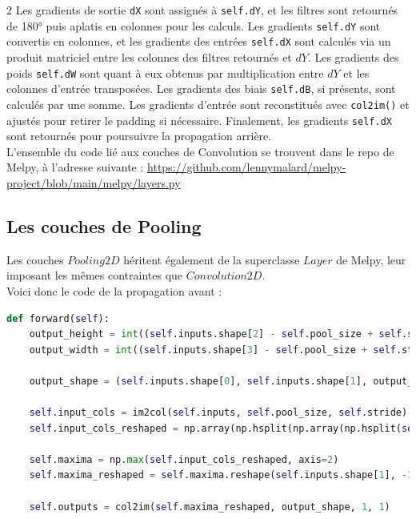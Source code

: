 \begin{multicols}{2}
Les gradients de sortie \texttt{dX} sont assignés à \texttt{self.dY}, et les filtres sont 
retournés de \ang{180} puis aplatis en colonnes pour les calculs. Les gradients \texttt{self.dY} 
sont convertis en colonnes, et les gradients des entrées \texttt{self.dX} sont calculés 
via un produit matriciel entre les colonnes des filtres retournés et $dY$. 
Les gradients des poids \texttt{self.dW} sont quant à eux obtenus par multiplication entre $dY$ et 
les colonnes d’entrée transposées. Les gradients des biais \texttt{self.dB}, si présents, sont calculés par une somme. 
Les gradients d’entrée sont reconstitués avec \texttt{col2im()} et ajustés pour retirer le padding si nécessaire. 
Finalement, les gradients \texttt{self.dX} sont retournés pour poursuivre la propagation arrière. \\

L'ensemble du code lié aux couches de Convolution se trouvent dans le repo de Melpy, à l'adresse suivante : \url{https://github.com/lennymalard/melpy-project/blob/main/melpy/layers.py}

\subsection{Les couches de Pooling}

Les couches $Pooling2D$ héritent également de la superclasse $Layer$ 
de Melpy, leur imposant les mêmes contraintes que $Convolution2D$.\\

Voici donc le code de la propagation avant : \\

\begin{lstlisting}[language=Python]
def forward(self):
    output_height = int((self.inputs.shape[2] - self.pool_size + self.stride) // self.stride)
    output_width = int((self.inputs.shape[3] - self.pool_size + self.stride) // self.stride)

    output_shape = (self.inputs.shape[0], self.inputs.shape[1], output_height, output_width)

    self.input_cols = im2col(self.inputs, self.pool_size, self.stride)
    self.input_cols_reshaped = np.array(np.hsplit(np.array(np.hsplit(self.input_cols, self.inputs.shape[0])), self.inputs.shape[1]))

    self.maxima = np.max(self.input_cols_reshaped, axis=2)
    self.maxima_reshaped = self.maxima.reshape(self.inputs.shape[1], -1)

    self.outputs = col2im(self.maxima_reshaped, output_shape, 1, 1)


\end{lstlisting}
\end{multicols}
